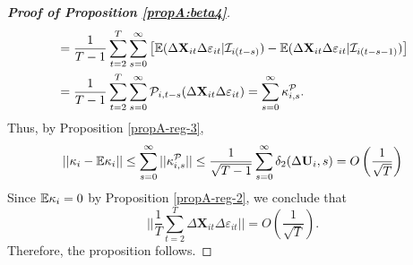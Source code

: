 \documentclass[a4paper,12pt]{article}
\begin{document}
\begin{proof}[\textnormal{\textbf{Proof of Proposition \ref{propA:beta4}}}]
\begin{align*}
&= \frac{1}{T-1}\sum_{t=2}^T \sum_{s=0}^\infty \big[ \mathbb{E} ( \Delta \mathbf{X}_{it}\Delta \varepsilon_{it}|\mathcal{I}_{i(t-s)} ) - \mathbb{E} ( \Delta \mathbf{X}_{it}\Delta \varepsilon_{it}|\mathcal{I}_{i(t-s-1)} )  \big] \\
&= \frac{1}{T-1}\sum_{t=2}^T \sum_{s=0}^\infty \mathcal{P}_{i, t-s} (\Delta \mathbf{X}_{it}\Delta \varepsilon_{it}) = \sum_{s=0}^\infty \kappa_{i, s}^{\mathcal{P}}.
\end{align*}
Thus, by Proposition \ref{propA-reg-3},
\[ || \kappa_i - \mathbb{E} \kappa_i || \leq \sum_{s=0}^\infty ||\kappa_{i, s}^{\mathcal{P}} || \leq \frac{1}{\sqrt{T-1}}\sum_{s=0}^\infty \delta_2(\Delta \mathbf{U}_i, s) = O\left(\frac{1}{\sqrt{T}}\right)
\]
Since $\mathbb{E} \kappa_i = 0$ by Proposition \ref{propA-reg-2}, we conclude that
\[  \Big|\Big| \frac{1}{T}\sum_{t=2}^T  \Delta \mathbf{X}_{it}\Delta \varepsilon_{it} \Big|\Big| = O\left(\frac{1}{\sqrt{T}}\right).
\]
Therefore, the proposition follows.
\end{proof}
\end{document}
